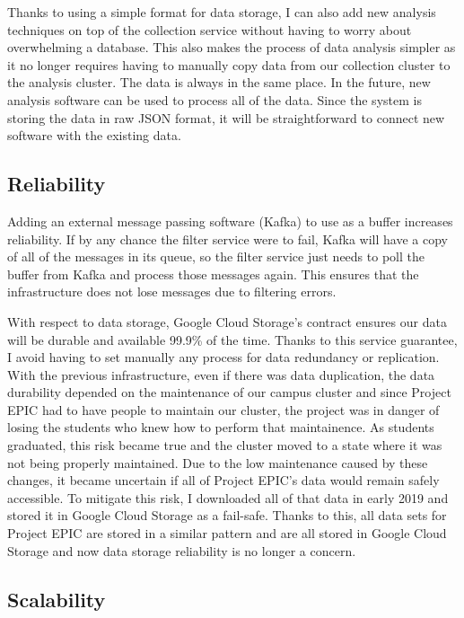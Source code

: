 Thanks to using a simple format for data storage, I can also add new analysis techniques on top of the collection service without having to worry about overwhelming a database. This also makes the process of data analysis simpler as it no longer requires having to manually copy data from our collection cluster to the analysis cluster. The data is always in the same place. In the future, new analysis software can be used to process all of the data. Since the system is storing the data in raw JSON format, it will be straightforward to connect new software with the existing data.

\subsection{Reliability}

Adding an external message passing software (Kafka) to use as a buffer increases reliability. If by any chance the filter service were to fail, Kafka will have a copy of all of the messages in its queue, so the filter service just needs to poll the buffer from Kafka and process those messages again. This ensures that the infrastructure does not lose messages due to filtering errors. 

With respect to data storage, Google Cloud Storage's contract ensures our data will be durable and available 99.9\% of the time. Thanks to this service guarantee, I avoid having to set manually any process for data redundancy or replication. With the previous infrastructure, even if there was data duplication, the data durability depended on the maintenance of our campus cluster and since Project EPIC had to have people to maintain our cluster, the project was in danger of losing the students who knew how to perform that maintainence. As students graduated, this risk became true and the cluster moved to a state where it was not being properly maintained. Due to the low maintenance caused by these changes, it became uncertain if all of Project EPIC's data would remain safely accessible. To mitigate this risk, I downloaded all of that data in early 2019 and stored it in Google Cloud Storage as a fail-safe. Thanks to this, all data sets for Project EPIC are stored in a similar pattern and are all stored in Google Cloud Storage and now data storage reliability is no longer a concern. 

\subsection{Scalability}

